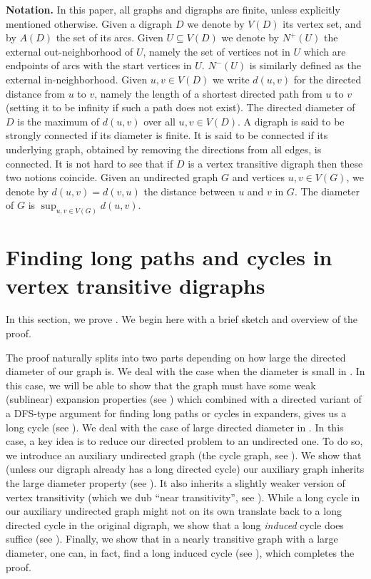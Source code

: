 \documentclass[english,11pt]{article}
\theoremstyle{definition}
\numberwithin{equation}{section}
\numberwithin{figure}{section}
\begin{document}
\textbf{Notation.} In this paper, all graphs and digraphs are finite, unless explicitly mentioned otherwise. Given a digraph $D$ we denote by $V(D)$ its vertex set, and by $A(D)$ the set of its arcs. Given $U \subseteq V(D)$ we denote by $N^{+}(U)$ the external out-neighborhood of $U$, namely the set of vertices not in $U$ which are endpoints of arcs with the start vertices in $U$. $N^{-}(U)$ is similarly defined as the external in-neighborhood. Given $u,v \in V(D)$ we write $d(u,v)$ for the directed distance from $u$ to $v$, namely the length of a shortest directed path from $u$ to $v$ (setting it to be infinity if such a path does not exist). The directed diameter of $D$ is the maximum of $d(u,v)$ over all $u,v \in V(D).$ A digraph is said to be strongly connected if its diameter is finite. It is said to be connected if its underlying graph, obtained by removing the directions from all edges, is connected. It is not hard to see that if $D$ is a vertex transitive digraph then these two notions coincide. Given an undirected graph $G$ and vertices $u,v\in V(G)$, we denote by $d(u,v)=d(v,u)$ the distance between $u$ and $v$ in $G$. The diameter of $G$ is $\sup_{u,v\in V(G)}d(u,v)$.

\section{Finding long paths and cycles in vertex transitive digraphs}

In this section, we prove . We begin here with a brief sketch and overview of the proof. 

The proof naturally splits into two parts depending on how large the directed diameter of our graph is. We deal with the case when the diameter is small in . In this case, we will be able to show that the graph must have some weak (sublinear) expansion properties (see ) which combined with a directed variant of a DFS-type argument for finding long paths or cycles in expanders, gives us a long cycle (see ). We deal with the case of large directed diameter in . In this case, a key idea is to reduce our directed problem to an undirected one. To do so, we introduce an auxiliary undirected graph (the cycle graph, see ). We show that (unless our digraph already has a long directed cycle) our auxiliary graph inherits the large diameter property (see ). It also inherits a slightly weaker version of vertex transitivity (which we dub ``near transitivity'', see ). While a long cycle in our auxiliary undirected graph might not on its own translate back to a long directed cycle in the original digraph, we show that a long \emph{induced} cycle does suffice (see ). Finally, we show that in a nearly transitive graph with a large diameter, one can, in fact, find a long induced cycle (see ), which completes the proof.  
\end{document}
